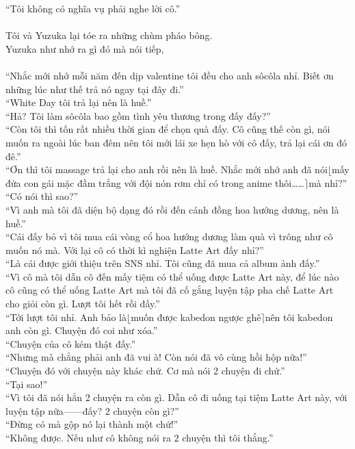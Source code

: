 \documentclass[12pt,a4paper, twosides]{book}
\begin{document}
“Tôi không có nghĩa vụ phải nghe lời cô.”\\
\\
Tôi và Yuzuka lại tóe ra những chùm pháo bông.\\
Yuzuka như nhớ ra gì đó mà nói tiếp,\\
\\
“Nhắc mới nhớ mỗi năm đến dịp valentine tôi đều cho anh sôcôla nhỉ. Biết ơn những lúc như thế trả nó ngay tại đây đi.”\\
“White Day tôi trả lại nên là huề.”\\
“Hả? Tôi làm sôcôla bao gồm tình yêu thương trong đấy đấy?”\\
“Còn tôi thì tốn rất nhiều thời gian để chọn quà đấy. Cô cũng thế còn gì, nói muốn ra ngoài lúc ban đêm nên tôi mới lái xe hẹn hò với cô đấy, trả lại cái ơn đó đê.”\\
“Ơn thì tôi massage trả lại cho anh rồi nên là huề. Nhắc mới nhớ anh đã nói$\lfloor$mấy đứa con gái mặc đầm trắng với đội nón rơm chỉ có trong anime thôi……$\rceil$mà nhỉ?”\\
“Có nói thì sao?”\\
“Vì anh mà tôi đã diện bộ dạng đó rồi đến cánh đồng hoa hướng dương, nên là huề.”\\
“Cái đấy bỏ vì tôi mua cái vòng cổ hoa hướng dương làm quà vì trông như cô muốn nó mà. Với lại cô có thời kì nghiện Latte Art đấy nhỉ?”\\
“Là cái được giới thiệu trên SNS nhỉ. Tôi cũng đã mua cả album ảnh đấy.”\\
“Vì cô mà tôi dẫn cô đến mấy tiệm có thể uống được Latte Art này, để lúc nào cô cũng có thể uống Latte Art mà tôi đã cố gắng luyện tập pha chế Latte Art cho giỏi còn gì. Lượt tôi hết rồi đấy.”\\
“Tới lượt tôi nhỉ. Anh bảo là$\lfloor$muốn được kabedon ngược ghê$\rceil$nên tôi kabedon anh còn gì. Chuyện đó coi như xóa.”\\
“Chuyện của cô kém thật đấy.”\\
“Nhưng mà chẳng phải anh đã vui à! Còn nói đã vô cùng hồi hộp nữa!”\\
“Chuyện đó với chuyện này khác chứ. Cơ mà nói 2 chuyện đi chứ.”\\
“Tại sao!”\\
“Vì tôi đã nói hẳn 2 chuyện ra còn gì. Dẫn cô đi uống tại tiệm Latte Art này, với luyện tập nữa——đấy? 2 chuyện còn gì?”\\
“Đừng có mà gộp nó lại thành một chứ!”\\
“Không được. Nếu như cô không nói ra 2 chuyện thì tôi thắng.”\\
\end{document}
